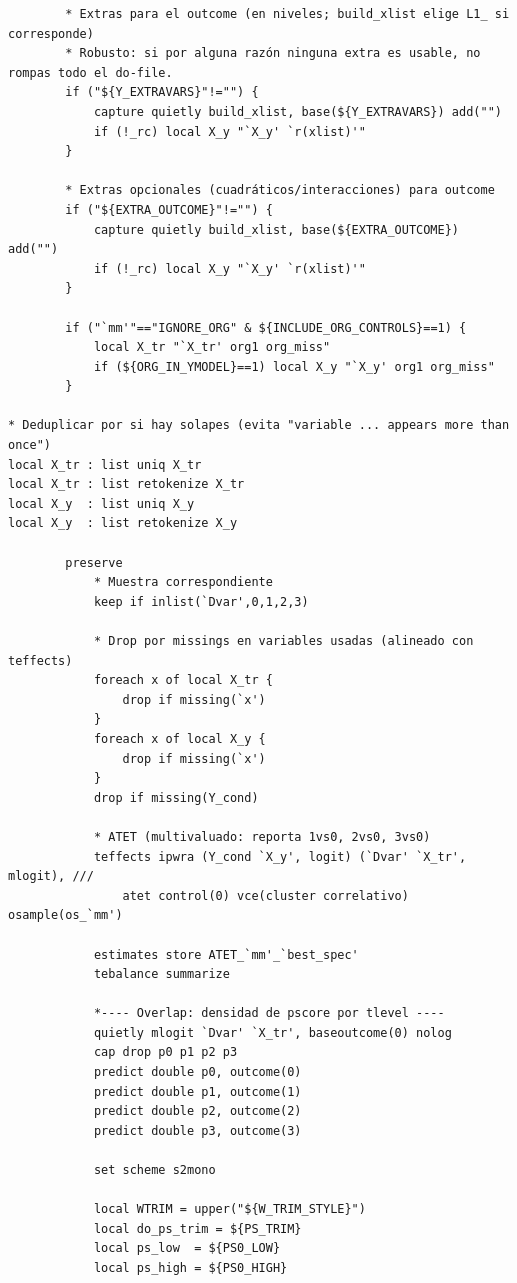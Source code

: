 \documentclass[12pt]{article}
\begin{document}
\begin{lstlisting}
        * Extras para el outcome (en niveles; build_xlist elige L1_ si corresponde)
        * Robusto: si por alguna razón ninguna extra es usable, no rompas todo el do-file.
        if ("${Y_EXTRAVARS}"!="") {
            capture quietly build_xlist, base(${Y_EXTRAVARS}) add("")
            if (!_rc) local X_y "`X_y' `r(xlist)'"
        }

        * Extras opcionales (cuadráticos/interacciones) para outcome
        if ("${EXTRA_OUTCOME}"!="") {
            capture quietly build_xlist, base(${EXTRA_OUTCOME}) add("")
            if (!_rc) local X_y "`X_y' `r(xlist)'"
        }

        if ("`mm'"=="IGNORE_ORG" & ${INCLUDE_ORG_CONTROLS}==1) {
            local X_tr "`X_tr' org1 org_miss"
            if (${ORG_IN_YMODEL}==1) local X_y "`X_y' org1 org_miss"
        }

* Deduplicar por si hay solapes (evita "variable ... appears more than once")
local X_tr : list uniq X_tr
local X_tr : list retokenize X_tr
local X_y  : list uniq X_y
local X_y  : list retokenize X_y

        preserve
            * Muestra correspondiente
            keep if inlist(`Dvar',0,1,2,3)

            * Drop por missings en variables usadas (alineado con teffects)
            foreach x of local X_tr {
                drop if missing(`x')
            }
            foreach x of local X_y {
                drop if missing(`x')
            }
            drop if missing(Y_cond)

            * ATET (multivaluado: reporta 1vs0, 2vs0, 3vs0)
            teffects ipwra (Y_cond `X_y', logit) (`Dvar' `X_tr', mlogit), ///
                atet control(0) vce(cluster correlativo) osample(os_`mm')

            estimates store ATET_`mm'_`best_spec'
            tebalance summarize

            *---- Overlap: densidad de pscore por tlevel ----
            quietly mlogit `Dvar' `X_tr', baseoutcome(0) nolog
            cap drop p0 p1 p2 p3
            predict double p0, outcome(0)
            predict double p1, outcome(1)
            predict double p2, outcome(2)
            predict double p3, outcome(3)

            set scheme s2mono

            local WTRIM = upper("${W_TRIM_STYLE}")
            local do_ps_trim = ${PS_TRIM}
            local ps_low  = ${PS0_LOW}
            local ps_high = ${PS0_HIGH}


\end{lstlisting}
\end{document}
